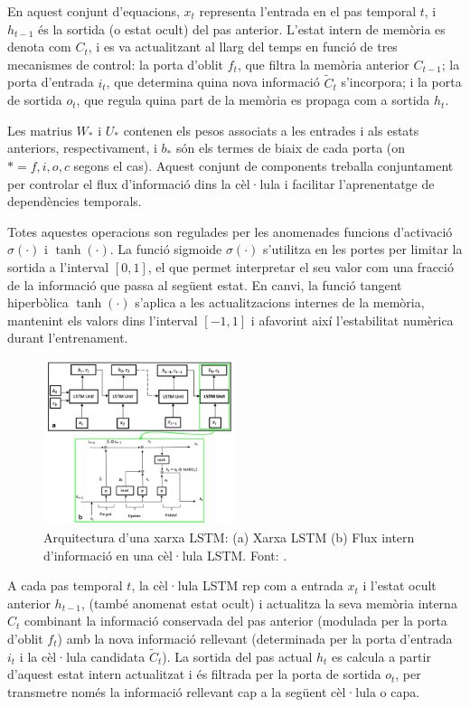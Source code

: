 \documentclass[../main.tex]{subfiles}
\begin{document}
En aquest conjunt d’equacions, $x_t$ representa l’entrada en el pas temporal $t$, i $h_{t-1}$ és la sortida (o estat ocult) del pas anterior. L’estat intern de memòria es denota com $C_t$, i es va actualitzant al llarg del temps en funció de tres mecanismes de control: la porta d’oblit $f_t$, que filtra la memòria anterior $C_{t-1}$; la porta d’entrada $i_t$, que determina quina nova informació $\tilde{C}_t$ s’incorpora; i la porta de sortida $o_t$, que regula quina part de la memòria es propaga com a sortida $h_t$. 

Les matrius $W_*$ i $U_*$ contenen els pesos associats a les entrades i als estats anteriors, respectivament, i $b_*$ són els termes de biaix de cada porta (on $* = f, i, o, c$ segons el cas). Aquest conjunt de components treballa conjuntament per controlar el flux d’informació dins la cèl·lula i facilitar l’aprenentatge de dependències temporals.

Totes aquestes operacions son regulades per les anomenades funcions d'activació $\sigma(\cdot)$ i  $\tanh(\cdot)$. La funció sigmoide $\sigma(\cdot)$ s’utilitza en les portes per limitar la sortida a l’interval $[0, 1]$, el que permet interpretar el seu valor com una fracció de la informació que passa al següent estat. En canvi, la funció tangent hiperbòlica $\tanh(\cdot)$ s’aplica a les actualitzacions internes de la memòria, mantenint els valors dins l’interval $[-1, 1]$ i afavorint així l’estabilitat numèrica durant l’entrenament.

\begin{figure}[H]
    \centering
    \includegraphics[width=0.5\textwidth]{figures/lstm/concept/2_lstm_cell_NN.png}
    \caption{Arquitectura d’una xarxa LSTM: (a) Xarxa LSTM (b) Flux intern d’informació en una cèl·lula LSTM. 
    Font: \cite{ozbek2021prediction}.}
    \label{fig:lstm_cell_nn}
\end{figure}

A cada pas temporal $t$, la cèl·lula LSTM rep com a entrada $x_t$ i l’estat ocult anterior $h_{t-1}$, (també anomenat estat ocult) i actualitza la seva memòria interna $C_t$ combinant la informació conservada del pas anterior (modulada per la porta d’oblit $f_t$) amb la nova informació rellevant (determinada per la porta d’entrada $i_t$ i la cèl·lula candidata $\tilde{C}_t$). La sortida del pas actual $h_t$ es calcula a partir d’aquest estat intern actualitzat i és filtrada per la porta de sortida $o_t$, per transmetre només la informació rellevant cap a la següent cèl·lula o capa.
\end{document}
